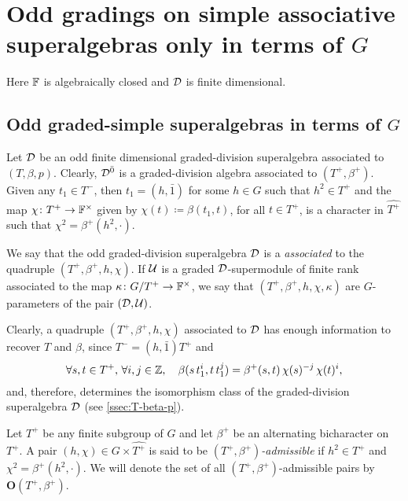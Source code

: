 \section{Odd gradings on simple associative superalgebras only in terms of \texorpdfstring{$G$}{G}}\label{sec:assc-only-G}

Here $\mathbb{F}$ is algebraically closed and $\mathcal{D}$ is finite dimensional.

\subsection{Odd graded-simple superalgebras in terms of $G$}\label{ssec:odd-div-G-only}

Let $\mathcal{D}$ be an odd finite dimensional graded-division superalgebra associated to $(T, \beta, p)$. 
Clearly, $\mathcal{D}^{\bar0}$ is a graded-division algebra associated to $(T^+, \beta^+)$. 
Given any $t_1 \in T^-$, then $t_1 = (h, \bar 1)$ for some $h\in G$ such that $h^2\in T^+$ and the map $\chi \colon T^+ \to \mathbb{F}^\times$ given by $\chi(t) \coloneqq \beta(t_1, t)$, for all $t\in T^+$, is a character in $\widehat{T^+}$ such that $\chi^2 = \beta^+ (h^2, \cdot)$. 

\begin{defi}
    We say that the odd graded-division superalgebra $\mathcal{D}$ is a \emph{associated} to the quadruple $(T^+, \beta^+, h,\chi)$. 
    If $\mathcal U$ is a graded $\mathcal{D}$-supermodule of finite rank associated to the map $\kappa\colon G/T^+ \to \mathbb{F}^\times$, we say that $(T^+, \beta^+, h, \chi, \kappa)$ are $G$-parameters of the pair $(\mathcal{D}, \mathcal U)$. 
\end{defi}

Clearly, a quadruple $(T^+, \beta^+, h,\chi)$ associated to $\mathcal{D}$ has enough information to recover $T$ and $\beta$, since $T^- = (h, \bar 1) T^+$ and
\[\label{eq:beta-from-h-chi}
    \forall s,t\in T^+,\, \forall i,j \in \mathbb{Z}, \quad \beta(s\, t_1^i,t \, t_1^j) = \beta^+(s,t)\, \chi (s)^{-j}\, \chi (t)^i,
\]
and, therefore, determines the isomorphism class of the graded-division superalgebra $\mathcal{D}$ (see \cref{ssec:T-beta-p}). 

\begin{defi}\label{def:odd-parameters}
    Let $T^+$ be any finite subgroup of $G$ and let $\beta^+$ be an alternating bicharacter on $T^+$. 
    A pair $(h,\chi) \in G \times \widehat{T^+}$ is said to be \emph{$(T^+, \beta^+)$-admissible} if 
    $h^2 \in T^+$ and $\chi^2 = \beta^+(h^2, \cdot)$. 
    We will denote the set of all $(T^+, \beta^+)$-admissible pairs by $\mathbf {O} (T^+, \beta^+)$. 
\end{defi}

